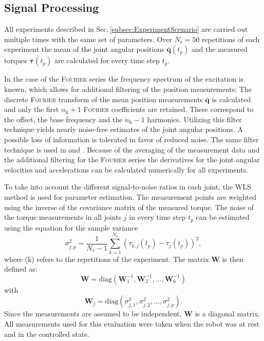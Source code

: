 
\subsection{Signal Processing}
\label{subsec:SignalProcessing}
All experiments described in Sec.\,\ref{subsec:ExperimentScenario} are carried out multiple times with the same set of parameters. Over $N_\text{r}=50$ repetitions of each experiment the mean of the joint angular positions $\overline{\boldsymbol{q}}(t_p)$ and the measured torques $\overline{\boldsymbol{\tau}}(t_p)$ are calculated for every time step $t_p$. 

In the case of the \textsc{Fourier} series the frequency spectrum of the excitation is known, which allows for additional filtering of the position measurements: 
The discrete \textsc{Fourier} transform of the mean position measurements $\overline{\boldsymbol{q}}$ is calculated and only the first $n_\mathrm{h}+1$ \textsc{Fourier} coefficients are retained. These correspond to the offset, the base frequency and the $n_\mathrm{h}-1$ harmonics. Utilizing this filter technique yields nearly noise-free estimates of the joint angular positions.
A possible loss of information is tolerated in favor of reduced noise.
The same filter technique is used in \cite{Olsen.2002} and \cite{Stueckelmaier.}. 
Because of the averaging of the measurement data and the additional filtering for the \textsc{Fourier} series the derivatives for the joint angular velocities and accelerations can be calculated numerically for all experiments.


To take into account the different signal-to-noise ratios in each joint, the WLS method is used for parameter estimation. The measurement points are weighted using the inverse of the covariance matrix of the measured torque. The noise of the torque measurements in all joints $j$ in every time step $t_p$ can be estimated using the equation for the sample variance
\begin{equation}\label{eq:var_tau}
	\sigma^2_{j,p} = \frac{1}{N_\textit{r}-1} \sum\limits_{k=1}^{N_\textit{r}} (\tau_{k,j} (t_p) - \overline{\tau}_j(t_p))^2,
\end{equation}
where (k) refers to the repetitions of the experiment.
The matrix $\boldsymbol{W}$ is then defined as:
\begin{equation}\label{eq:WLS_Gew}
	\boldsymbol{W} = \mathrm{diag}(\boldsymbol{W}_1^{-1}, \boldsymbol{W}_2^{-1}, \hdots, \boldsymbol{W}_6^{-1})
\end{equation}
	with
\begin{equation}
	\boldsymbol{W}_j = \mathrm{diag}(\sigma^2_{j,1}, \sigma^2_{j,2}, \hdots, \sigma^2_{j,p}).
\end{equation}
Since the measurements are assumed to be independent, $\boldsymbol{W}$ is a diagonal matrix.
All measurements used for this evaluation were taken when the robot was at rest and in the controlled state.

